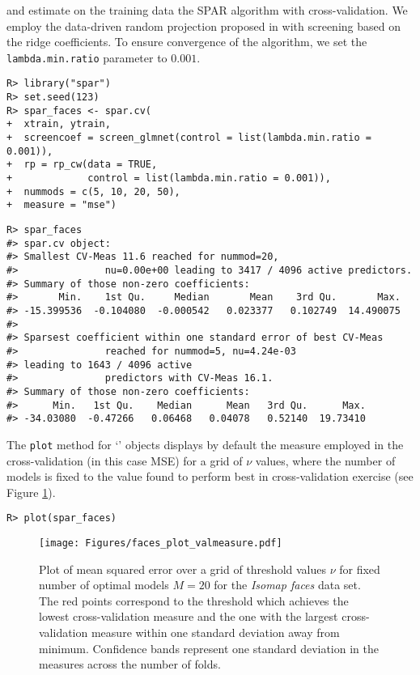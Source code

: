 \documentclass[
  article]{jss}
\newcommand{\class}[1]{`\code{#1}'}
\begin{document}
and estimate on the training data the SPAR algorithm with
cross-validation. We employ the data-driven random projection proposed
in \citet{parzer2024sparse} with screening based on the ridge
coefficients. To ensure convergence of the  algorithm, we
set the \texttt{lambda.min.ratio} parameter to \(0.001\).

\begin{verbatim}
R> library("spar")
R> set.seed(123)
R> spar_faces <- spar.cv(
+  xtrain, ytrain,
+  screencoef = screen_glmnet(control = list(lambda.min.ratio = 0.001)),
+  rp = rp_cw(data = TRUE, 
+             control = list(lambda.min.ratio = 0.001)),
+  nummods = c(5, 10, 20, 50),
+  measure = "mse")
\end{verbatim}

\begin{verbatim}
R> spar_faces
#> spar.cv object:
#> Smallest CV-Meas 11.6 reached for nummod=20,
#>               nu=0.00e+00 leading to 3417 / 4096 active predictors.
#> Summary of those non-zero coefficients:
#>       Min.    1st Qu.     Median       Mean    3rd Qu.       Max. 
#> -15.399536  -0.104080  -0.000542   0.023377   0.102749  14.490075 
#> 
#> Sparsest coefficient within one standard error of best CV-Meas
#>               reached for nummod=5, nu=4.24e-03 
#> leading to 1643 / 4096 active
#>               predictors with CV-Meas 16.1.
#> Summary of those non-zero coefficients:
#>      Min.   1st Qu.    Median      Mean   3rd Qu.      Max. 
#> -34.03080  -0.47266   0.06468   0.04078   0.52140  19.73410
\end{verbatim}

The \texttt{plot} method for \class{spar.cv} objects displays by default
the measure employed in the cross-validation (in this case MSE) for a
grid of \(\nu\) values, where the number of models is fixed to the value
found to perform best in cross-validation exercise (see Figure
\ref{fig:facesplot_valmeasure}).

\begin{verbatim}
R> plot(spar_faces)
\end{verbatim}

\begin{figure}[t!]
\centering
\texttt{[image: Figures/faces\_plot\_valmeasure.pdf]}
\caption{Plot of mean squared error over a grid of threshold values $\nu$ for fixed number of optimal models $M=20$ for the \emph{Isomap faces} data set.
The red points correspond to the threshold which achieves the lowest
cross-validation measure and the one with the largest cross-validation 
measure within one standard deviation away from minimum. Confidence bands represent one standard deviation in the measures across the number of folds. \label{fig:facesplot_valmeasure}}
\end{figure}
\end{document}

